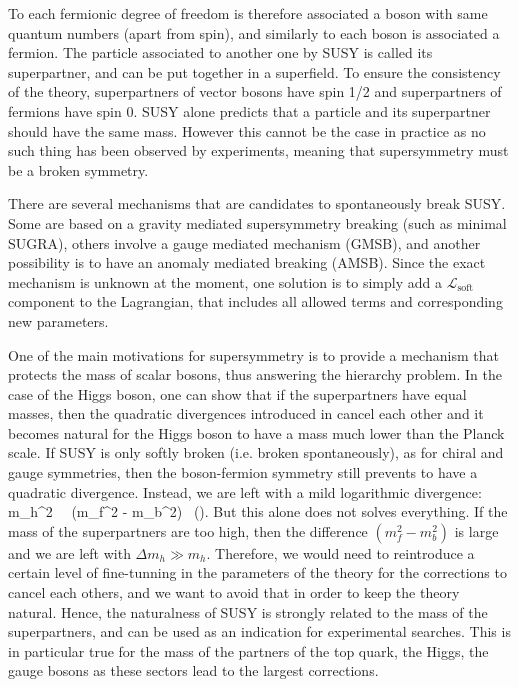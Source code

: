     To each fermionic degree of freedom is therefore associated a boson with
    same quantum numbers (apart from spin), and similarly to each boson is
    associated a fermion. The particle associated to another one by SUSY is
    called its superpartner, and can be put together in a superfield. To ensure
    the consistency of the theory, superpartners of vector bosons have spin 1/2
    and superpartners of fermions have spin 0. SUSY alone predicts that a
    particle and its superpartner should have the same mass. However this cannot
    be the case in practice as no such thing has been observed by experiments,
    meaning that supersymmetry must be a broken symmetry.

    There are several mechanisms that are candidates to spontaneously break
    SUSY. Some are based on a gravity mediated supersymmetry breaking (such as
    minimal SUGRA), others involve a gauge mediated mechanism (GMSB), and
    another possibility is to have an anomaly mediated breaking (AMSB). Since
    the exact mechanism is unknown at the moment, one solution is to simply add
    a $\mathcal{L}_\text{soft}$ component to the Lagrangian, that includes all
    allowed terms and corresponding new parameters.

    One of the main motivations for supersymmetry is to provide a mechanism that
    protects the mass of scalar bosons, thus answering the hierarchy problem. In
    the case of the Higgs boson, one can show that if the superpartners have
    equal masses, then the quadratic divergences introduced in
     cancel each other and it
    becomes natural for the Higgs boson to have a mass much lower than the
    Planck scale.  If SUSY is only softly broken (i.e. broken spontaneously), as
    for chiral and gauge symmetries, then the boson-fermion symmetry still
    prevents to have a quadratic divergence. Instead, we are left with a mild
    logarithmic divergence:
    {
        \Delta m_h^2 \, \propto \, (m_f^2 - m_b^2) \, \left(\right).
    }
    But this alone does not solves everything. If the mass of the superpartners
    are too high, then the difference $(m_f^2 - m_b^2)$ is large and we are left
    with $\Delta m_h \gg m_h$.  Therefore, we would need to reintroduce a
    certain level of fine-tunning in the parameters of the theory for the
    corrections to cancel each others, and we want to avoid that in order to
    keep the theory natural. Hence, the naturalness of SUSY is strongly related
    to the mass of the superpartners, and can be used as an indication for
    experimental searches. This is in particular true for the mass of the
    partners of the top quark, the Higgs, the gauge bosons as these sectors lead
    to the largest corrections.

